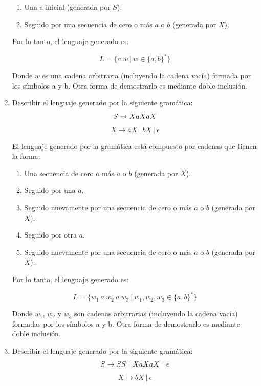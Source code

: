 \documentclass[12pt]{report} %
\begin{document}
\begin{enumerate}
\begin{solucion}[Ejercicio 1.b]
   \begin{enumerate}
       \item Una a inicial (generada por $S$).
       \item Seguido por una secuencia de cero o más $a$ o $b$ (generada por $X$).
   \end{enumerate}

   Por lo tanto, el lenguaje generado es:

   $$
   L = \{ a \ w \ | \ w \in \{a, b\}^* \}
   $$

   Donde $w$ es una cadena arbitraria (incluyendo la cadena vacía) formada por los símbolos a y b. Otra forma de demostrarlo es mediante doble inclusión.

   \end{solucion}
\item
  Describir el lenguaje generado por la siguiente gramática: \[
   S \to XaXaX \\
   \] \[
   X \to aX \ | \ bX \ | \ \epsilon
   \]

  \begin{solucion}[Ejercicio 1.c]

   El lenguaje generado por la gramática está compuesto por cadenas que tienen la forma:

   \begin{enumerate}
       \item Una secuencia de cero o más $a$ o $b$ (generada por $X$).
       \item Seguido por una $a$.
       \item Seguido nuevamente por una secuencia de cero o más $a$ o $b$ (generada por $X$).
       \item Seguido por otra $a$.
       \item Seguido nuevamente por una secuencia de cero o más $a$ o $b$ (generada por $X$).
   \end{enumerate}

   Por lo tanto, el lenguaje generado es:

   $$
   L = \{ w_1 \ a \ w_2 \ a \ w_3  \ | \ w_1, w_2, w_3 \in \{a, b\}^* \}
   $$

   Donde $w_1$, $w_2$ y $w_3$ son cadenas arbitrarias (incluyendo la cadena vacía) formadas por los símbolos a y b. Otra forma de demostrarlo es mediante doble inclusión.

   \end{solucion}
\item
  Describir el lenguaje generado por la siguiente gramática: \[
   S \to SS \ | \ XaXaX \ | \ \epsilon \\
   \] \[
   X \to bX \ | \ \epsilon
   \]


\end{enumerate}
\end{document}
